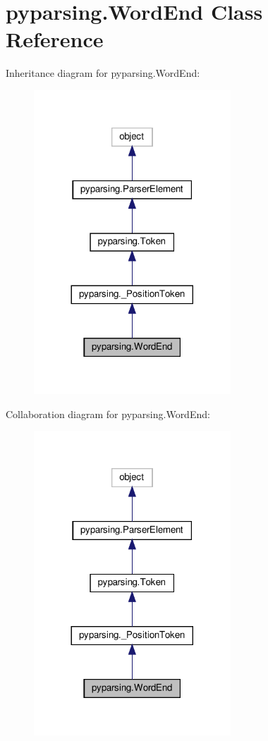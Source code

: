 \hypertarget{classpyparsing_1_1WordEnd}{}\section{pyparsing.\+Word\+End Class Reference}
\label{classpyparsing_1_1WordEnd}


Inheritance diagram for pyparsing.\+Word\+End\+:
\nopagebreak
\begin{figure}[H]
\begin{center}
\leavevmode
\includegraphics[width=209pt]{classpyparsing_1_1WordEnd__inherit__graph}
\end{center}
\end{figure}


Collaboration diagram for pyparsing.\+Word\+End\+:
\nopagebreak
\begin{figure}[H]
\begin{center}
\leavevmode
\includegraphics[width=209pt]{classpyparsing_1_1WordEnd__coll__graph}
\end{center}
\end{figure}
